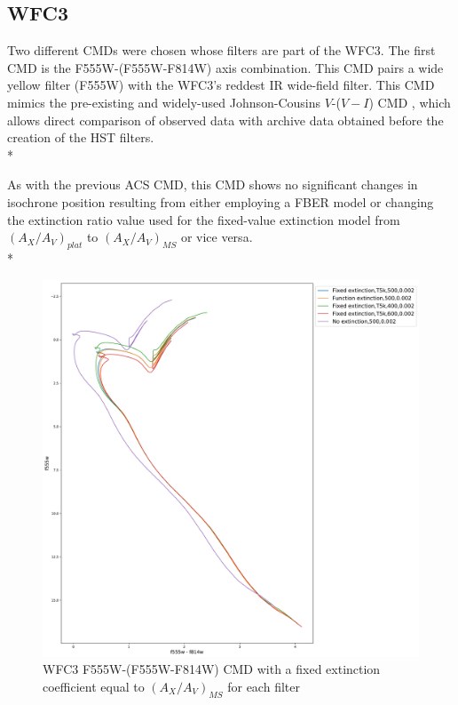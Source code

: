 \documentclass[12pt, a4paper]{report}
\begin{document}
\subsection{WFC3} \label{WFC3_isoc}

Two different CMDs were chosen whose filters are part of the WFC3. The first CMD is the F555W-(F555W-F814W) axis combination. This CMD pairs a wide yellow filter (F555W) with the WFC3's reddest IR wide-field filter. This CMD mimics the pre-existing and widely-used Johnson-Cousins $V$-($V-I$) CMD \citep{2014wfc..rept...16S}, which allows direct comparison of observed data with archive data obtained before the creation of the HST filters.\\*

As with the previous ACS CMD, this CMD shows no significant changes in isochrone position resulting from either employing a FBER model or changing the extinction ratio value used for the fixed-value extinction model from $(A_{X}/A_{V})_{plat}$ to $(A_{X}/A_{V})_{MS}$ or vice versa.\\*

\begin{figure}[h]
\begin{center}
\includegraphics[width=1.0\textwidth]{../basti_isochrones_10_13Gyr/Extinction_T5k_FeH0fix_func_f555w_f555wmf814w_500_400_600_Myr_FeH_0p002_ref_noext_Av_1p0.pdf}
\caption{WFC3 F555W-(F555W-F814W) CMD with a fixed extinction coefficient equal to $(A_{X}/A_{V})_{MS}$ for each filter}
\label{wfc3_isoc1_T5k}
\end{center}
\end{figure}
\end{document}
